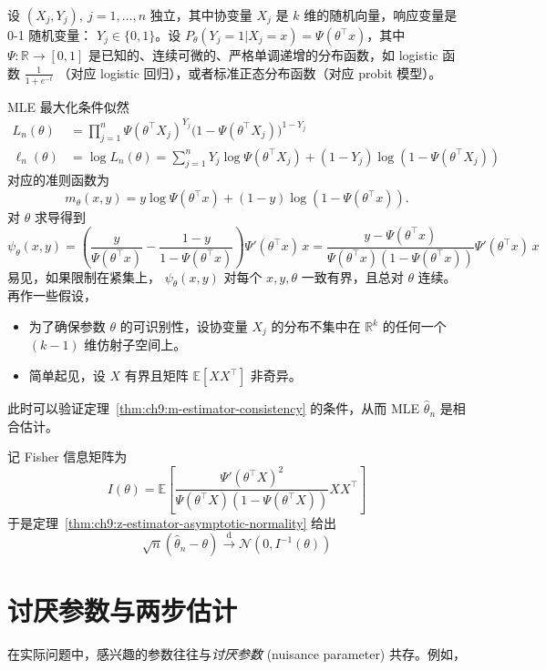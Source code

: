 \begin{example}[二分类回归]\label{ex:ch9:binary-classification}
设 $(X_j,Y_j),\ j=1,\dots,n$ 独立，其中协变量 $X_j$ 是 $k$ 维的随机向量，响应变量是 0-1 随机变量： $Y_j\in\{0,1\}$。设 $P_\theta(Y_j=1|X_j=x)=\Psi(\theta^\top x)$，其中 $\Psi:\mathbb R\to[0,1]$ 是已知的、连续可微的、严格单调递增的分布函数，如 logistic 函数 $\frac1{1+e^{-t}}$ （对应 logistic 回归），或者标准正态分布函数（对应 probit 模型）。

MLE 最大化条件似然\[\begin{aligned} L_n(\theta) &= \prod_{j=1}^n \Psi(\theta^\top X_j)^{Y_j} \bigl(1 - \Psi(\theta^\top X_j)\bigr)^{1 - Y_j}\\ \ell_n(\theta)&=\log L_n(\theta)=\sum_{j=1}^nY_j\log\Psi(\theta^\top X_j)+(1-Y_j)\log(1-\Psi(\theta^\top X_j)) \end{aligned}\]
对应的准则函数为
\[
m_\theta(x,y)=y\log\Psi(\theta^\top x)
+(1-y)\log(1-\Psi(\theta^\top x)).
\]
对 $\theta$ 求导得到\[\psi_\theta(x,y)=\left(\frac{y}{\Psi(\theta^\top x)}-\frac{1-y}{1-\Psi(\theta^\top x)}\right)\Psi'(\theta^\top x)\,x=\frac{y-\Psi(\theta^\top x)}{\Psi(\theta^\top x)(1-\Psi(\theta^\top x))}\Psi'(\theta^\top x)\,x\]
易见，如果限制在紧集上， $\psi_{\theta}(x,y)$ 对每个 $x,y,\theta$ 一致有界，且总对 $\theta$ 连续。再作一些假设，

\begin{itemize}
\tightlist
\item
  为了确保参数 $\theta$ 的可识别性，设协变量 $X_j$ 的分布不集中在 $\mathbb{R}^k$ 的任何一个 $(k-1)$ 维仿射子空间上。
\item
  简单起见，设 $X$ 有界且矩阵 $\mathbb{E}[XX^\top]$ 非奇异。
\end{itemize}
此时可以验证定理~\ref{thm:ch9:m-estimator-consistency} 的条件，从而 MLE $\widehat\theta_n$ 是相合估计。

记 Fisher 信息矩阵为\[I(\theta) = \mathbb{E}\left[\frac{\Psi'(\theta^\top X)^2}{\Psi(\theta^\top X)(1-\Psi(\theta^\top X))}XX^\top\right]\]
于是定理~\ref{thm:ch9:z-estimator-asymptotic-normality} 给出\[\sqrt{n}(\widehat{\theta}_n - \theta) \overset{\mathrm{d}}{\to} \mathcal{N}(0, I^{-1}(\theta))\]
\end{example}
\section{讨厌参数与两步估计}

在实际问题中，感兴趣的参数往往与\emph{讨厌参数} (nuisance parameter) 共存。例如，

